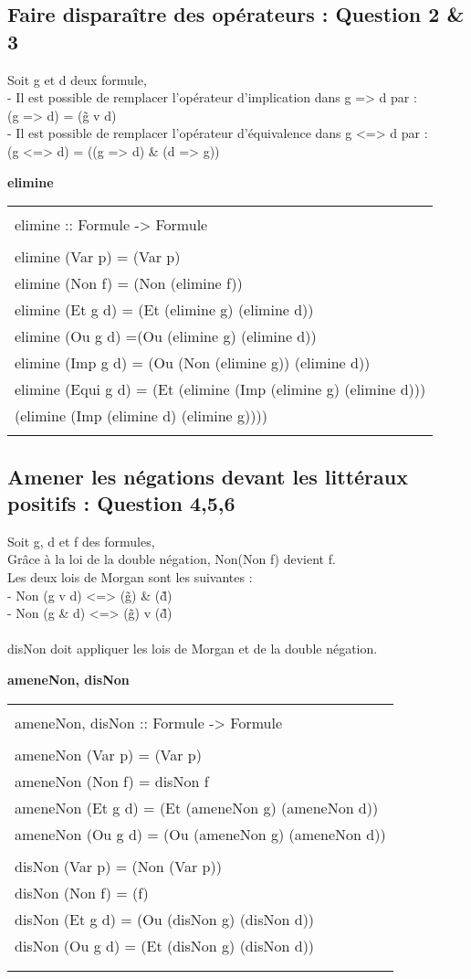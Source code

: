 \documentclass{article}
\newenvironment{code}[1]
    {\begin{center}
    \textbf{#1\\[1ex]}
    \begin{tabular}{|p{0.9\textwidth}|}
    \hline\\
    }
    { 
    \\\\\hline
    \end{tabular} 
    \end{center}
    }
\begin{document}
\subsection{Faire disparaître des opérateurs : Question 2 \& 3}
Soit g et d deux formule, \\
- Il est possible de remplacer l'opérateur d'implication dans g => d par : \\
(g => d) = (\~g v d) \\
- Il est possible de remplacer l'opérateur d'équivalence dans g <=> d par : \\
(g <=> d) = ((g => d) \& (d => g))
\newpage
\begin{code}{elimine}
    elimine :: Formule -> Formule\\
    \\
    elimine (Var p) = (Var p)\\
    elimine (Non f) = (Non (elimine f))\\
    elimine (Et g d) = (Et (elimine g) (elimine d))\\
    elimine (Ou g d) =(Ou (elimine g) (elimine d))\\
    elimine (Imp g d) = (Ou (Non (elimine g)) (elimine d))\\
    elimine (Equi g d) = (Et (elimine (Imp (elimine g) (elimine d)))\\ (elimine (Imp (elimine d) (elimine g))))

\end{code}

\subsection{Amener les négations devant les littéraux positifs : Question 4,5,6}
Soit g, d et f des formules,\\
Grâce à la loi de la double négation, Non(Non f) devient f.\\
Les deux lois de Morgan sont les suivantes :\\
- Non (g v d) <=> (\~g) \& (\~d)\\
- Non (g \& d) <=> (\~g) v (\~d)
\\
\\
disNon doit appliquer les lois de Morgan et de la double négation.
\begin{code}{ameneNon, disNon}
    ameneNon, disNon :: Formule -> Formule\\
    \\
    ameneNon (Var p) = (Var p)\\
    ameneNon (Non f) = disNon f\\
    ameneNon (Et g d) = (Et (ameneNon g) (ameneNon d))\\
    ameneNon (Ou g d) = (Ou (ameneNon g) (ameneNon d))\\
    \\
    disNon (Var p) = (Non (Var p))\\
    disNon (Non f) = (f)\\
    disNon (Et g d) = (Ou (disNon g) (disNon d))\\
    disNon (Ou g d) = (Et (disNon g) (disNon d))\\
\end{code}
\newpage
\end{document}
